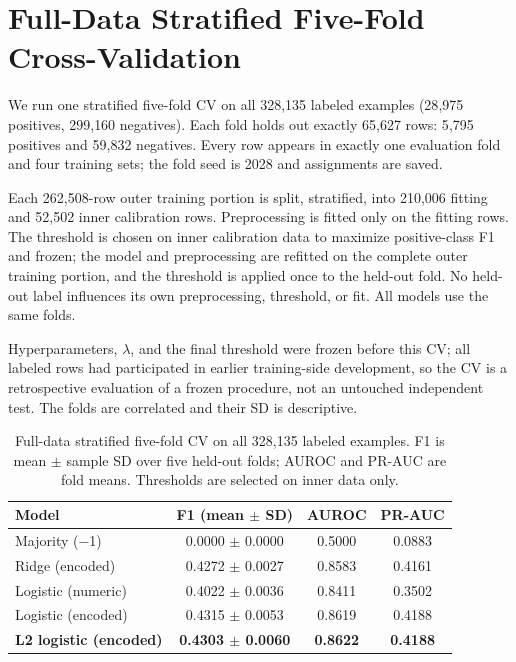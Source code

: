 \documentclass[10pt,conference,compsocconf]{IEEEtran}
\begin{document}
\section{Full-Data Stratified Five-Fold Cross-Validation}
\label{sec:cv}
We run one stratified five-fold CV on all 328{,}135 labeled examples
(28{,}975 positives, 299{,}160 negatives). Each fold holds out exactly 65{,}627
rows: 5{,}795 positives and 59{,}832 negatives. Every row appears in exactly one
evaluation fold and four training sets; the fold seed is 2028 and assignments
are saved.

Each 262{,}508-row outer training portion is split, stratified, into 210{,}006
fitting and 52{,}502 inner calibration rows. Preprocessing is fitted only on the
fitting rows. The threshold is chosen on inner calibration data to maximize
positive-class F1 and frozen; the model and preprocessing are refitted on the
complete outer training portion, and the threshold is applied once to the
held-out fold. No held-out label influences its own preprocessing, threshold,
or fit. All models use the same folds.

Hyperparameters, $\lambda$, and the final threshold were frozen before this CV;
all labeled rows had participated in earlier training-side development, so the
CV is a retrospective evaluation of a frozen procedure, not an untouched
independent test. The folds are correlated and their SD is descriptive.

\begin{table}[t]
\centering
\small
\caption{Full-data stratified five-fold CV on all 328{,}135 labeled examples.
F1 is mean $\pm$ sample SD over five held-out folds; AUROC and PR-AUC are fold
means. Thresholds are selected on inner data only.}
\label{tab:cv}
\setlength{\tabcolsep}{3pt}
\begin{tabular}{lccc}
\hline
Model & F1 (mean $\pm$ SD) & AUROC & PR-AUC\\
\hline
Majority ($-$1) & 0.0000 $\pm$ 0.0000 & 0.5000 & 0.0883\\
Ridge (encoded) & 0.4272 $\pm$ 0.0027 & 0.8583 & 0.4161\\
Logistic (numeric) & 0.4022 $\pm$ 0.0036 & 0.8411 & 0.3502\\
Logistic (encoded) & 0.4315 $\pm$ 0.0053 & 0.8619 & 0.4188\\
\textbf{L2 logistic (encoded)} & \textbf{0.4303 $\pm$ 0.0060} & \textbf{0.8622} & \textbf{0.4188}\\
\hline
\end{tabular}
\end{table}
\end{document}

